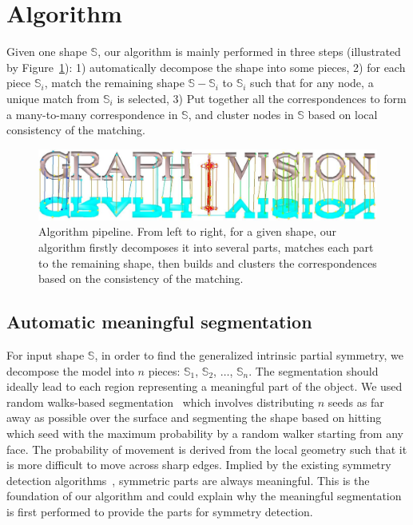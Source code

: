 \section{Algorithm}
\label{sec:alg}

Given one shape $\mathbb{S}$, our algorithm is mainly performed in three steps (illustrated by Figure~\ref{fig:Eager}): 1) automatically decompose the shape into some pieces, 2) for each piece $\mathbb{S}_i$, match the remaining shape $\mathbb{S}-\mathbb{S}_i$ to $\mathbb{S}_i$ such that for any node, a unique match from $\mathbb{S}_i$ is selected, 3) Put together all the correspondences to form a many-to-many correspondence in $\mathbb{S}$, and cluster nodes in $\mathbb{S}$ based on local consistency of the matching.

\begin{figure}[t!]
\centering
  \includegraphics[width=0.99\linewidth]{figures/pipe.pdf}
  \caption{Algorithm pipeline.
  From left to right, for a given shape, our algorithm firstly decomposes it into several parts, matches each part to the remaining shape, then builds and clusters the correspondences based on the consistency of the matching. }
\label{fig:Eager}
\end{figure}

\subsection{Automatic meaningful segmentation}
\label{subsec:segmentation}

For input shape $\mathbb{S}$, in order to find the generalized intrinsic partial symmetry, we decompose the model into $n$ pieces: $\mathbb{S}_1$, $\mathbb{S}_2$, $\dots$, $\mathbb{S}_n$.
The segmentation should ideally lead to each region representing a meaningful part of the object. We used random walks-based segmentation~\cite{lai2009} which involves distributing $n$ seeds as far away as possible over the surface and segmenting the shape based on hitting which seed with the maximum probability by a random walker starting from any face. The probability of movement is derived from the local geometry such that it is more difficult to move across sharp edges. Implied by the existing symmetry detection algorithms~\cite{xu2009,berner2011}, symmetric parts are always meaningful. This is the foundation of our algorithm and could explain why the meaningful segmentation is first performed to provide the parts for symmetry detection.

